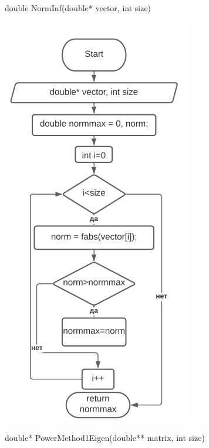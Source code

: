 double NormInf(double* vector, int size)

\includegraphics[scale=0.7]{block9.png}

double* PowerMethod1Eigen(double** matrix, int size)

